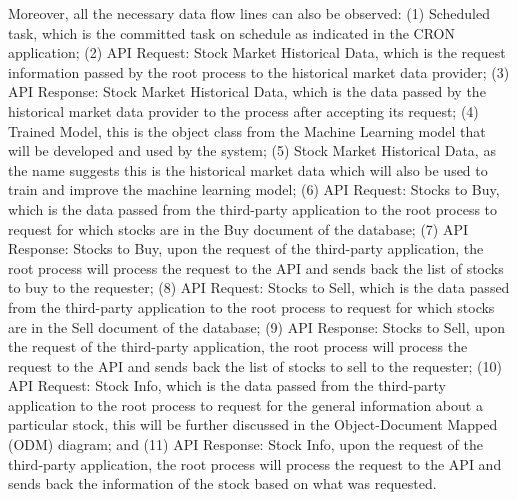 Moreover, all the necessary data flow lines can also be observed: 
(1) Scheduled task, which is the committed task on schedule as indicated 
in the CRON application; 
(2) API Request: Stock Market Historical Data, which is the request 
information passed by the root process to the historical market data provider; 
(3) API Response: Stock Market Historical Data, which is the data passed by the 
historical market data provider to the process after accepting its request; 
(4) Trained Model, this is the object class from the Machine Learning model that 
will be developed and used by the system; 
(5) Stock Market Historical Data, as the name suggests this is the historical 
market data which will also be used to train and improve the machine learning model; 
(6) API Request: Stocks to Buy, which is the data passed from the third-party 
application to the root process to request for which stocks are in the Buy 
document of the database; 
(7) API Response: Stocks to Buy, upon the request of the third-party application, 
the root process will process the request to the API and sends back the 
list of stocks to buy to the requester; 
(8) API Request: Stocks to Sell, which is the data passed from the 
third-party application to the root process to request for which stocks 
are in the Sell document of the database; 
(9) API Response: Stocks to Sell, upon the request of the third-party application, 
the root process will process the request to the API and sends back the list of 
stocks to sell to the requester; 
(10) API Request: Stock Info, which is the data passed from the third-party 
application to the root process to request for the general information about a 
particular stock, this will be further discussed in the Object-Document Mapped 
(ODM) diagram; and 
(11) API Response: Stock Info, upon the request of the third-party application, 
the root process will process the request to the API and sends back the information 
of the stock based on what was requested.

